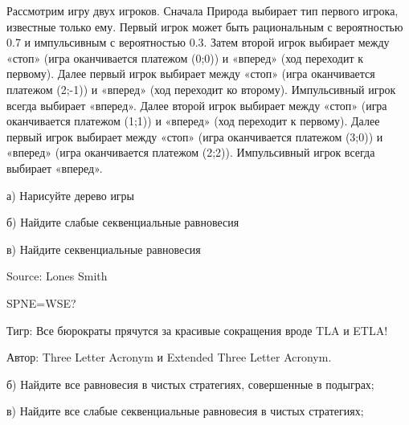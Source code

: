 \begin{problem}

Рассмотрим игру двух игроков. Сначала Природа выбирает тип первого игрока, известные только ему. Первый игрок может быть рациональным с вероятностью 0.7 и импульсивным с вероятностью 0.3. Затем второй игрок выбирает между «стоп» (игра оканчивается  платежом (0;0)) и «вперед» (ход переходит к первому). Далее первый игрок выбирает между «стоп» (игра оканчивается платежом (2;-1)) и «вперед» (ход переходит ко второму). Импульсивный игрок всегда выбирает «вперед». Далее второй игрок выбирает между «стоп» (игра оканчивается платежом (1;1)) и «вперед» (ход переходит к первому). Далее первый игрок выбирает между «стоп» (игра оканчивается платежом (3;0)) и «вперед» (игра оканчивается платежом (2;2)). Импульсивный игрок всегда выбирает «вперед». \par
а) Нарисуйте дерево игры \par
б) Найдите слабые секвенциальные равновесия \par
в) Найдите секвенциальные равновесия \par
Source: Lones Smith \par



\begin{sol}

\end{sol}
\end{problem}



\begin{problem}
 SPNE=WSE?\par
Тигр: Все бюрократы прячутся за красивые сокращения вроде TLA и ETLA!\par
Автор: Three Letter Acronym и Extended Three Letter Acronym.\par
{}
б) Найдите все равновесия в чистых стратегиях, совершенные в подыграх;\par
в) Найдите все слабые секвенциальные равновесия в чистых стратегиях;\par



\begin{sol}

\end{sol}
\end{problem}



